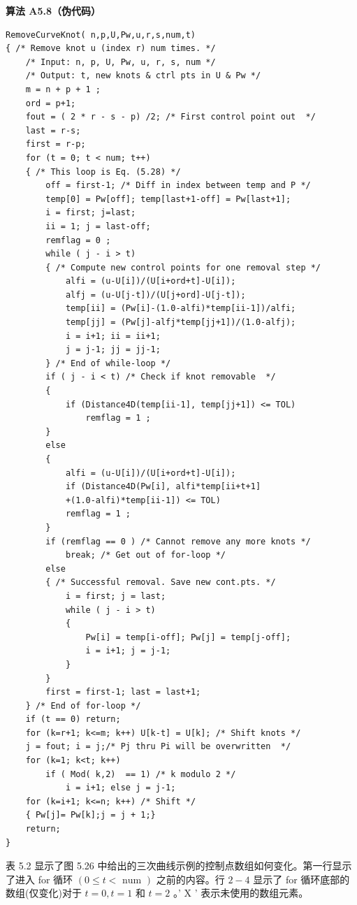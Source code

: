 \documentclass[../main.tex]{subfiles}
\begin{document}
\par\medskip\noindent\textbf{算法 A5.8（伪代码）}\par
\begin{verbatim}
RemoveCurveKnot( n,p,U,Pw,u,r,s,num,t)
{ /* Remove knot u (index r) num times. */
    /* Input: n, p, U, Pw, u, r, s, num */
    /* Output: t, new knots & ctrl pts in U & Pw */
    m = n + p + 1 ;
    ord = p+1;
    fout = ( 2 * r - s - p) /2; /* First control point out  */
    last = r-s;
    first = r-p;
    for (t = 0; t < num; t++)
    { /* This loop is Eq. (5.28) */
        off = first-1; /* Diff in index between temp and P */
        temp[0] = Pw[off]; temp[last+1-off] = Pw[last+1];
        i = first; j=last;
        ii = 1; j = last-off;
        remflag = 0 ;
        while ( j - i > t)
        { /* Compute new control points for one removal step */
            alfi = (u-U[i])/(U[i+ord+t]-U[i]);
            alfj = (u-U[j-t])/(U[j+ord]-U[j-t]);
            temp[ii] = (Pw[i]-(1.0-alfi)*temp[ii-1])/alfi;
            temp[jj] = (Pw[j]-alfj*temp[jj+1])/(1.0-alfj);
            i = i+1; ii = ii+1;
            j = j-1; jj = jj-1;
        } /* End of while-loop */
        if ( j - i < t) /* Check if knot removable  */
        {
            if (Distance4D(temp[ii-1], temp[jj+1]) <= TOL)
                remflag = 1 ;
        }
        else
        {
            alfi = (u-U[i])/(U[i+ord+t]-U[i]);
            if (Distance4D(Pw[i], alfi*temp[ii+t+1]
            +(1.0-alfi)*temp[ii-1]) <= TOL)
            remflag = 1 ;
        }
        if (remflag == 0 ) /* Cannot remove any more knots */
            break; /* Get out of for-loop */
        else
        { /* Successful removal. Save new cont.pts. */
            i = first; j = last;
            while ( j - i > t)
            {
                Pw[i] = temp[i-off]; Pw[j] = temp[j-off];
                i = i+1; j = j-1;
            }
        }
        first = first-1; last = last+1;
    } /* End of for-loop */
    if (t == 0) return;
    for (k=r+1; k<=m; k++) U[k-t] = U[k]; /* Shift knots */
    j = fout; i = j;/* Pj thru Pi will be overwritten  */
    for (k=1; k<t; k++)
        if ( Mod( k,2)  == 1) /* k modulo 2 */
            i = i+1; else j = j-1;
    for (k=i+1; k<=n; k++) /* Shift */
    { Pw[j]= Pw[k];j = j + 1;}
    return;
}
\end{verbatim}

表 5.2 显示了图 5.26 中给出的三次曲线示例的控制点数组如何变化。第一行显示了进入 for 循环 \(\left( {0 \leq  t < \text{ num }}\right)\) 之前的内容。行 \(2 - 4\) 显示了 for 循环底部的数组(仅变化)对于 \(t = 0,t = 1\) 和 \(t = 2\) 。’ \(\mathrm{X}\) ’ 表示未使用的数组元素。
\end{document}
